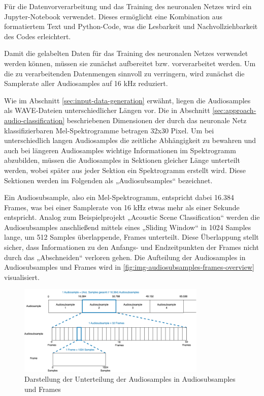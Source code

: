 Für die Datenvorverarbeitung und das Training des neuronalen Netzes wird ein Jupyter-Notebook verwendet. Dieses ermöglicht eine Kombination aus formatiertem Text und Python-Code, was die Lesbarkeit und Nachvollziehbarkeit des Codes erleichtert.

Damit die gelabelten Daten für das Training des neuronalen Netzes verwendet werden können, müssen sie zunächst aufbereitet bzw. vorverarbeitet werden. Um die zu verarbeitenden Datenmengen sinnvoll zu verringern, wird zunächst die Samplerate aller Audiosamples auf 16 kHz reduziert.

Wie im Abschnitt \ref{sec:input-data-generation} erwähnt, liegen die Audiosamples als WAVE-Dateien unterschiedlicher Längen vor. Die in Abschnitt \ref{sec:approach-audio-classification} beschriebenen Dimensionen der durch das neuronale Netz klassifizierbaren Mel-Spektrogramme betragen 32x30 Pixel. Um bei unterschiedlich langen Audiosamples die zeitliche Abhängigkeit zu bewahren und auch bei längeren Audiosamples wichtige Informationen im Spektrogramm abzubilden, müssen die Audiosamples in Sektionen gleicher Länge unterteilt werden, wobei später aus jeder Sektion ein Spektrogramm erstellt wird. Diese Sektionen werden im Folgenden als „Audiosubsamples“ bezeichnet.

Ein Audiosubsample, also ein Mel-Spektrogramm, entspricht dabei 16.384 Frames, was bei einer Samplerate von 16 kHz etwas mehr als einer Sekunde entspricht. Analog zum Beispielprojekt „Acoustic Scene Classification“ \cite{stm-asc}\cite{stm-asc-2} werden die Audiosubsamples anschließend mittels eines „Sliding Window“ in 1024 Samples lange, um 512 Samples überlappende, Frames unterteilt. Diese Überlappung stellt sicher, dass Informationen zu den Anfangs- und Endzeitpunkten der Frames nicht durch das „Abschneiden“ verloren gehen. Die Aufteilung der Audiosamples in Audiosubsamples und Frames wird in \autoref{fig:img-audiosubsamples-frames-overview} visualisiert.

\begin{figure}[h!]
\centering
\includegraphics[width=0.8\textwidth]{images/08_durchfuehrung/audiosubsamples_frames_overview.png}
\caption{Darstellung der Unterteilung der Audiosamples in Audiosubsamples und Frames}
\label{fig:img-audiosubsamples-frames-overview}
\end{figure}

